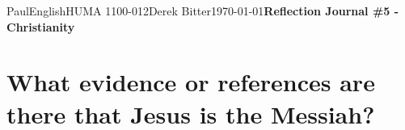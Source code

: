 \documentclass[12pt,letterpaper]{article}
\begin{document}
\begin{mla}{Paul}{English}{HUMA 1100-012}{Derek Bitter}{\today}{\textbf{Reflection Journal \#5 - Christianity}}

\section{What evidence or references are there that Jesus is the Messiah?}



\end{mla}
\end{document}
